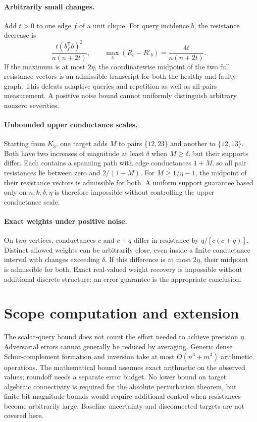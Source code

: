 \documentclass[11pt,letterpaper]{article}
\begin{document}
\paragraph{Arbitrarily small changes.} Add $t>0$ to one edge $f$ of a unit clique. For query incidence $b$, the resistance decrease is
\[
 \frac{t(b_f^{\mathsf T}b)^2}{n(n+2t)},
 \qquad\max_b(R_b-R'_b)=\frac{4t}{n(n+2t)}.
\]
If the maximum is at most $2\eta$, the coordinatewise midpoint of the two full resistance vectors is an admissible transcript for both the healthy and faulty graph. This defeats adaptive queries and repetition as well as all-pairs measurement. A positive noise bound cannot uniformly distinguish arbitrary nonzero severities.

\paragraph{Unbounded upper conductance scales.} Starting from $K_3$, one target adds $M$ to pairs $\{12,23\}$ and another to $\{12,13\}$. Both have two increases of magnitude at least $\delta$ when $M\ge\delta$, but their supports differ. Each contains a spanning path with edge conductances $1+M$, so all pair resistances lie between zero and $2/(1+M)$. For $M\ge1/\eta-1$, the midpoint of their resistance vectors is admissible for both. A uniform support guarantee based only on $n,k,\delta,\eta$ is therefore impossible without controlling the upper conductance scale.

\paragraph{Exact weights under positive noise.} On two vertices, conductances $c$ and $c+q$ differ in resistance by $q/[c(c+q)]$. Distinct allowed weights can be arbitrarily close, even inside a finite conductance interval with changes exceeding $\delta$. If this difference is at most $2\eta$, their midpoint is admissible for both. Exact real-valued weight recovery is impossible without additional discrete structure; an error guarantee is the appropriate conclusion.

\section{Scope computation and extension}
The scalar-query bound does not count the effort needed to achieve precision $\eta$. Adversarial errors cannot generally be reduced by averaging. Generic dense Schur-complement formation and inversion take at most $O(n^3+m^3)$ arithmetic operations. The mathematical bound assumes exact arithmetic on the observed values; roundoff needs a separate error budget. No lower bound on target algebraic connectivity is required for the absolute perturbation theorem, but finite-bit magnitude bounds would require additional control when resistances become arbitrarily large. Baseline uncertainty and disconnected targets are not covered here.
\end{document}
